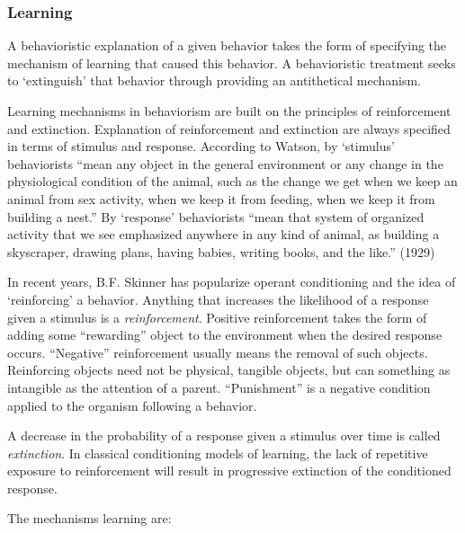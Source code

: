 \begin{refsection}
\begin{enumerate}
\end{enumerate}

\subsubsection{Learning}
\label{learning}

A behavioristic explanation of a given behavior takes the form of specifying the mechanism of learning that caused this behavior. A behavioristic treatment seeks to `extinguish' that behavior through providing an antithetical mechanism.

Learning mechanisms in behaviorism are built on the principles of reinforcement and extinction. Explanation of reinforcement and extinction are always specified in terms of stimulus and response. According to Watson, by `stimulus' behaviorists “mean any object in the general environment or any change in the physiological condition of the animal, such as the change we get when we keep an animal from sex activity, when we keep it from feeding, when we keep it from building a nest.” By `response' behaviorists “mean that system of organized activity that we see emphasized anywhere in any kind of animal, as building a skyscraper, drawing plans, having babies, writing books, and the like.” (1929)

In recent years, B.F. Skinner has popularize operant conditioning and the idea of `reinforcing' a behavior. Anything that increases the likelihood of a response given a stimulus is a \emph{reinforcement}. Positive reinforcement takes the form of adding some “rewarding” object to the environment when the desired response occurs. “Negative” reinforcement usually means the removal of such objects. Reinforcing objects need not be physical, tangible objects, but can something as intangible as the attention of a parent. “Punishment” is a negative condition applied to the organism following a behavior.

A decrease in the probability of a response given a stimulus over time is called \emph{extinction}. In classical conditioning models of learning, the lack of repetitive exposure to reinforcement will result in progressive extinction of the conditioned response.

The mechanisms learning are:


\end{refsection}
